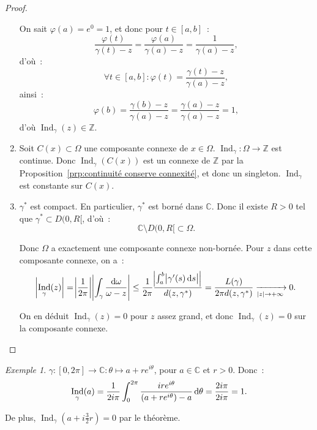\documentclass{report}
\theoremstyle{definition}
\theoremstyle{remark}
\newtheorem{ex}{Exemple}[chapter]
\numberwithin{equation}{section}
\newcommand{\C}{\mathbb C}
\newcommand{\Z}{\mathbb Z}
\DeclareMathOperator{\Ind}{Ind}
\newcommand{\pinfty}{{+\infty}}
\begin{document}
\begin{proof}
\begin{enumerate}
				On sait $\varphi(a) = e^0 = 1$, et donc pour $t \in [a, b]$~:
				\begin{equation}
					\frac {\varphi(t)}{\gamma(t) - z} = \frac {\varphi(a)}{\gamma(a) - z} = \frac 1{\gamma(a) - z},
				\end{equation}
				d'où~:
				\begin{equation}
					\forall t \in [a, b] : \varphi(t) = \frac {\gamma(t) - z}{\gamma(a) - z},
				\end{equation}
				ainsi~:
				\begin{equation}
					\varphi(b) = \frac {\gamma(b) - z}{\gamma(a) - z} = \frac {\gamma(a) - z}{\gamma(a) - z} = 1,
				\end{equation}
				d'où $\Ind_\gamma(z) \in \Z$.
				\item Soit $C(x) \subset \Omega$ une composante connexe de $x \in \Omega$. $\Ind_\gamma : \Omega \to \Z$ est continue. Donc $\Ind_\gamma(C(x))$ est un
				connexe de $\Z$ par la Proposition~\eqref{prp:continuité conserve connexité}, et donc un singleton. $\Ind_\gamma$ est constante sur $C(x)$.
				\item $\gamma^*$ est compact. En particulier, $\gamma^*$ est borné dans $\C$. Donc il existe $R > 0$ tel que $\gamma^* \subset D(0, R[$, d'où~:
				\begin{equation}
					\C \setminus D(0, R[ \subset \Omega.
				\end{equation}

				Donc $\Omega$ a exactement une composante connexe non-bornée. Pour $z$ dans cette composante connexe, on a~:
				\begin{equation}
					\abs {\Ind_\gamma(z)} = \abs {\frac 1{2\pi}}\abs {\int_\gamma \frac {\dif \omega}{\omega - z}}
						\leq \frac 1{2\pi}\frac {\abs {\int_a^b\abs {\gamma'(s)\dif s}}}{d(z, \gamma^*)} = \frac {L(\gamma)}{2\pi d(z, \gamma^*)} \xrightarrow[\abs z \to \pinfty]{} 0.
				\end{equation}

				On en déduit $\Ind_\gamma(z) = 0$ pour $z$ assez grand, et donc $\Ind_\gamma(z) = 0$ sur la composante connexe.
			\end{enumerate}
			\end{proof}

			\begin{ex} $\gamma : [0, 2\pi] \to \C : \theta \mapsto a + re^{i\theta}$, pour $a \in \C$ et $r > 0$. Donc~:
			\begin{equation}
				\Ind_\gamma(a) = \frac 1{2i\pi}\int_0^{2\pi}\frac {ire^{i\theta}}{(a + re^{i\theta}) - a}\dif \theta = \frac {2i\pi}{2i\pi} = 1.
			\end{equation}

			De plus, $\Ind_\gamma(a + i\frac 32r) = 0$ par le théorème.
			\end{ex}
\end{document}

